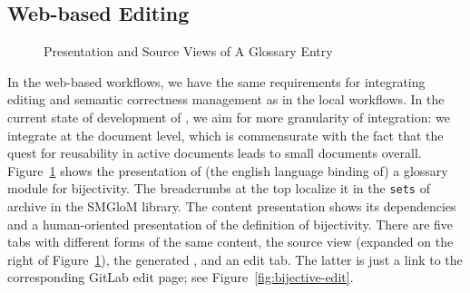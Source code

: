 
\subsection{Web-based \sys Editing}\label{sec:web}

\begin{figure}[ht]\centering
  \quad
  \caption{Presentation and Source Views of A Glossary Entry}\label{fig:bijective}
\end{figure}

In the web-based workflows, we have the same requirements for integrating editing and
semantic correctness management as in the local workflows. In the current state of
development of \sys, we aim for more granularity of integration: we integrate at the
document level, which is commensurate with the fact that the quest for reusability in
active documents leads to small documents overall. Figure~\ref{fig:bijective} shows the
presentation of (the english language binding of) a glossary module for bijectivity. The
breadcrumbs at the top localize it in the \texttt{sets} of archive in the \textsf{SMGloM}
library. The content presentation shows its dependencies and a human-oriented presentation
of the definition of bijectivity. There are five tabs with different forms of the same
content, the source view (expanded on the right of Figure~\ref{fig:bijective}), the
generated \omdoc, and an edit tab. The latter is just a link to the corresponding
GitLab edit page; see Figure~\ref{fig:bijective-edit}.

